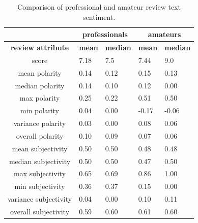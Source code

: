 \documentclass[letterpaper]{article}
\begin{document}
\begin{table}[tb]
\scriptsize
\begin{tabularx}{\linewidth}{|c|X|X|X|X|}
\hline  & \multicolumn{2}{|c|}{\textbf{professionals}} & \multicolumn{2}{|c|}{\textbf{amateurs}}  \\ 
\hline \textbf{review attribute} & \textbf{mean} & \textbf{median} & \textbf{mean} & \textbf{median} \\ 

\hline score & 7.18 & 7.5 & 7.44 & 9.0 \\ 

\hline mean polarity & 0.14 & 0.12 & 0.15 & 0.13 \\ 
\hline median polarity & 0.14 & 0.10 & 0.12 & 0.00 \\ 
\hline max polarity & 0.25 & 0.22 & 0.51 & 0.50 \\ 
\hline min polarity & 0.04 & 0.00 & -0.17 & -0.06 \\ 
\hline variance polarity & 0.03 & 0.00 & 0.08 & 0.06 \\ 
\hline overall polarity & 0.10 & 0.09 & 0.07 & 0.06 \\ 

\hline mean subjectivity & 0.50 & 0.50 & 0.48 & 0.48 \\ 
\hline median subjectivity & 0.50 & 0.50 & 0.47 & 0.50 \\ 
\hline max subjectivity & 0.65 & 0.69 & 0.86 & 1.00 \\ 
\hline min subjectivity & 0.36 & 0.37 & 0.15 & 0.00 \\ 
\hline variance subjectivity & 0.04 & 0.00 & 0.10 & 0.11 \\ 
\hline overall subjectivity & 0.59 & 0.60 & 0.61 & 0.60 \\ 
\hline 
\end{tabularx}
\caption{Comparison of professional and amateur review text sentiment.}
\label{tab:review_pol_subj}
\end{table}
\end{document}
